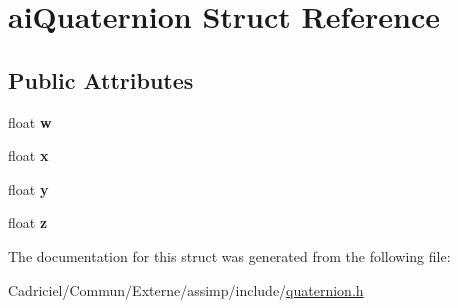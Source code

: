 \hypertarget{structai_quaternion}{}\section{ai\+Quaternion Struct Reference}
\label{structai_quaternion}
\subsection*{Public Attributes}
\begin{DoxyCompactItemize}
\item 
float {\bfseries w}\hypertarget{structai_quaternion_a410b3c46417d67d728a01a5810907a36}{}\label{structai_quaternion_a410b3c46417d67d728a01a5810907a36}

\item 
float {\bfseries x}\hypertarget{structai_quaternion_af9db21b086c14d8654d62005f740e75f}{}\label{structai_quaternion_af9db21b086c14d8654d62005f740e75f}

\item 
float {\bfseries y}\hypertarget{structai_quaternion_a1695fefbc60becf95fcafcc08573ab44}{}\label{structai_quaternion_a1695fefbc60becf95fcafcc08573ab44}

\item 
float {\bfseries z}\hypertarget{structai_quaternion_acc30da6103d5131fb1bed6640f1eeda0}{}\label{structai_quaternion_acc30da6103d5131fb1bed6640f1eeda0}

\end{DoxyCompactItemize}


The documentation for this struct was generated from the following file\+:\begin{DoxyCompactItemize}
\item 
Cadriciel/\+Commun/\+Externe/assimp/include/\hyperlink{quaternion_8h}{quaternion.\+h}\end{DoxyCompactItemize}
